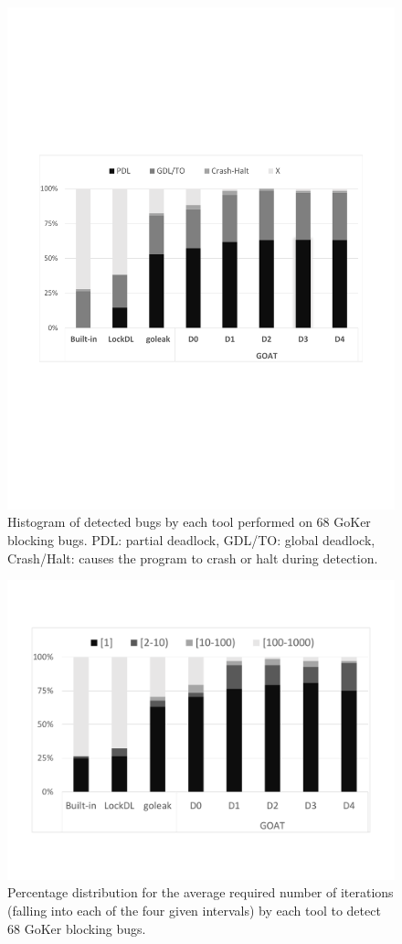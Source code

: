 \begin{figure}
\centering
  \includegraphics[width=.85\linewidth]{goat/figs/P4_detections.pdf}
  \caption{Histogram of detected bugs by each tool performed on 68 GoKer blocking bugs. PDL: partial deadlock, GDL/TO: global deadlock, Crash/Halt: causes the program to crash or halt during detection.}
  \label{fig:detection}
\end{figure}


\begin{figure}
\centering
  \includegraphics[width=.85\linewidth]{goat/figs/P4_runs2.pdf}
  \caption{Percentage distribution for the average required number of iterations (falling into each of the four given intervals) by each tool to detect 68 GoKer blocking bugs.}
  \label{fig:runs}
\end{figure}





